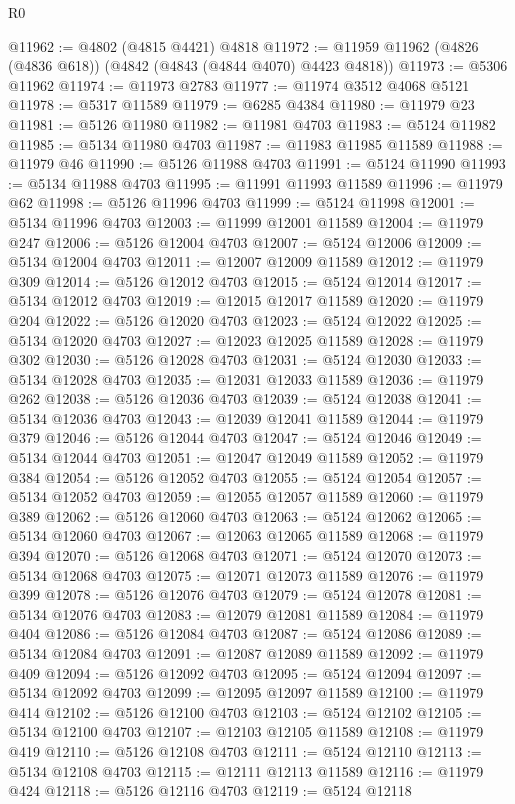 \begin{lexlean}{R0}
\begin{coremodule}
@11962 := @4802 (@4815 @4421) @4818
@11972 := @11959 @11962 (@4826 (@4836 @618)) (@4842 (@4843 (@4844 @4070) @4423 @4818))
@11973 := @5306 @11962
@11974 := @11973 @2783
@11977 := @11974 @3512 @4068 @5121
@11978 := @5317 @11589
@11979 := @6285 @4384
@11980 := @11979 @23
@11981 := @5126 @11980
@11982 := @11981 @4703
@11983 := @5124 @11982
@11985 := @5134 @11980 @4703
@11987 := @11983 @11985 @11589
@11988 := @11979 @46
@11990 := @5126 @11988 @4703
@11991 := @5124 @11990
@11993 := @5134 @11988 @4703
@11995 := @11991 @11993 @11589
@11996 := @11979 @62
@11998 := @5126 @11996 @4703
@11999 := @5124 @11998
@12001 := @5134 @11996 @4703
@12003 := @11999 @12001 @11589
@12004 := @11979 @247
@12006 := @5126 @12004 @4703
@12007 := @5124 @12006
@12009 := @5134 @12004 @4703
@12011 := @12007 @12009 @11589
@12012 := @11979 @309
@12014 := @5126 @12012 @4703
@12015 := @5124 @12014
@12017 := @5134 @12012 @4703
@12019 := @12015 @12017 @11589
@12020 := @11979 @204
@12022 := @5126 @12020 @4703
@12023 := @5124 @12022
@12025 := @5134 @12020 @4703
@12027 := @12023 @12025 @11589
@12028 := @11979 @302
@12030 := @5126 @12028 @4703
@12031 := @5124 @12030
@12033 := @5134 @12028 @4703
@12035 := @12031 @12033 @11589
@12036 := @11979 @262
@12038 := @5126 @12036 @4703
@12039 := @5124 @12038
@12041 := @5134 @12036 @4703
@12043 := @12039 @12041 @11589
@12044 := @11979 @379
@12046 := @5126 @12044 @4703
@12047 := @5124 @12046
@12049 := @5134 @12044 @4703
@12051 := @12047 @12049 @11589
@12052 := @11979 @384
@12054 := @5126 @12052 @4703
@12055 := @5124 @12054
@12057 := @5134 @12052 @4703
@12059 := @12055 @12057 @11589
@12060 := @11979 @389
@12062 := @5126 @12060 @4703
@12063 := @5124 @12062
@12065 := @5134 @12060 @4703
@12067 := @12063 @12065 @11589
@12068 := @11979 @394
@12070 := @5126 @12068 @4703
@12071 := @5124 @12070
@12073 := @5134 @12068 @4703
@12075 := @12071 @12073 @11589
@12076 := @11979 @399
@12078 := @5126 @12076 @4703
@12079 := @5124 @12078
@12081 := @5134 @12076 @4703
@12083 := @12079 @12081 @11589
@12084 := @11979 @404
@12086 := @5126 @12084 @4703
@12087 := @5124 @12086
@12089 := @5134 @12084 @4703
@12091 := @12087 @12089 @11589
@12092 := @11979 @409
@12094 := @5126 @12092 @4703
@12095 := @5124 @12094
@12097 := @5134 @12092 @4703
@12099 := @12095 @12097 @11589
@12100 := @11979 @414
@12102 := @5126 @12100 @4703
@12103 := @5124 @12102
@12105 := @5134 @12100 @4703
@12107 := @12103 @12105 @11589
@12108 := @11979 @419
@12110 := @5126 @12108 @4703
@12111 := @5124 @12110
@12113 := @5134 @12108 @4703
@12115 := @12111 @12113 @11589
@12116 := @11979 @424
@12118 := @5126 @12116 @4703
@12119 := @5124 @12118

\end{coremodule}
\end{lexlean}
